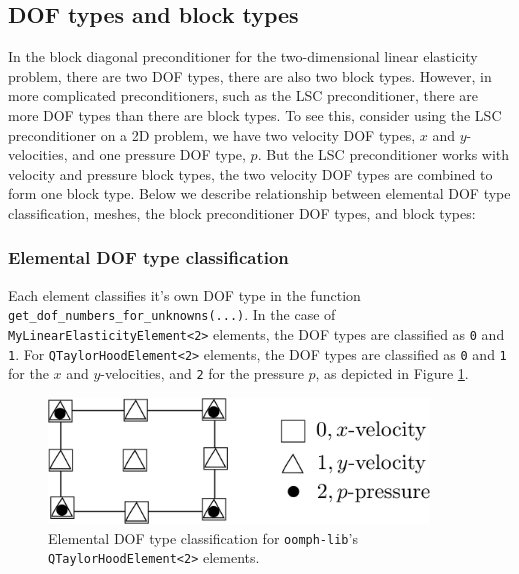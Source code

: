 \subsection{DOF types and block types\label{sec:dof_types_and_block_types}}
In the block diagonal preconditioner for the two-dimensional linear elasticity 
problem, there are two DOF types, there are also two block types. However, in 
more complicated preconditioners, such as the LSC preconditioner, there are 
more DOF types than there are block types. To see this, consider  using the 
LSC preconditioner on a 2D problem, we have two velocity DOF types, $x$ and 
$y$-velocities, and one pressure DOF type, $p$. But the LSC preconditioner 
works with velocity and pressure block types, the two velocity DOF types are 
combined to form one block type. Below we describe relationship between 
elemental DOF type classification, meshes, the block preconditioner DOF types, 
and block types:


\subsubsection{Elemental DOF type classification}

Each element classifies it's own DOF type in the function 
\texttt{get\_\allowbreak dof\_\allowbreak numbers\_\allowbreak for\_\allowbreak unknowns(...)}. In the case of 
\texttt{My\allowbreak Linear\allowbreak Elasticity\allowbreak Element<2>} elements, the DOF types are classified as 
\texttt{0} and \texttt{1}. For \texttt{Q\allowbreak TaylorHood\allowbreak Element<2>} 
elements, the DOF types are classified as \texttt{0} and \texttt{1} for the $x$
and $y$-velocities, and \texttt{2} for the pressure $p$, as depicted in Figure \ref{fig:2DTH_DOF_classification}.
\begin{figure}[H]
\centering
\includegraphics[width=0.9\textwidth]{./pic/taylorhood_dof_classification.pdf}
\caption{Elemental DOF type classification for \texttt{oomph-\allowbreak lib}'s 
\texttt{Q\allowbreak TaylorHood\allowbreak Element<2>} elements.}
\label{fig:2DTH_DOF_classification}
\end{figure}

